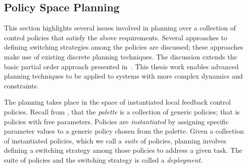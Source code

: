 \subsection{Policy Space Planning}
\label{sec:approach_planning}

This section highlights several issues involved in planning over a
collection of control policies that satisfy the above requirements.
Several approaches to defining switching strategies among the policies
are discussed; these approaches make use of existing discrete planning
techniques.  The discussion extends the basic partial order approach
presented in~\cite{bur_riz_kod_99}.  This thesis work enables advanced
planning techniques to be applied to systems with more complex
dynamics and constraints.

The planning takes place in the space of instantiated local feedback control
policies.  Recall from , that the \emph{palette} is a
collection of generic policies; that is policies with free parameters.  Policies are
\emph{instantiated} by assigning specific parameter values to a generic policy chosen
from the palette.  Given a collection of instantiated policies, which we call a
\emph{suite} of policies, planning involves defining a switching strategy among those
policies to address a given task.  The suite of policies and the switching strategy
is called a \emph{deployment}.


